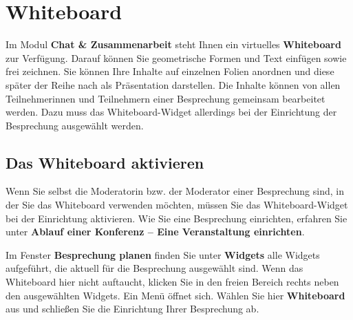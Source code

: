 \documentclass[
  letterpaper,
  DIV=11,
  numbers=noendperiod]{scrreprt}
\begin{document}
\section{Whiteboard}\label{whiteboard}

Im Modul \textbf{Chat \& Zusammenarbeit} steht Ihnen ein virtuelles
\textbf{Whiteboard} zur Verfügung. Darauf können Sie geometrische Formen
und Text einfügen sowie frei zeichnen. Sie können Ihre Inhalte auf
einzelnen Folien anordnen und diese später der Reihe nach als
Präsentation darstellen. Die Inhalte können von allen Teilnehmerinnen
und Teilnehmern einer Besprechung gemeinsam bearbeitet werden. Dazu muss
das Whiteboard-Widget allerdings bei der Einrichtung der Besprechung
ausgewählt werden.

\subsection{Das Whiteboard aktivieren}\label{das-whiteboard-aktivieren}

Wenn Sie selbst die Moderatorin bzw. der Moderator einer Besprechung
sind, in der Sie das Whiteboard verwenden möchten, müssen Sie das
Whiteboard-Widget bei der Einrichtung aktivieren. Wie Sie eine
Besprechung einrichten, erfahren Sie unter \textbf{Ablauf einer
Konferenz -- Eine Veranstaltung einrichten}.

Im Fenster \textbf{Besprechung planen} finden Sie unter \textbf{Widgets}
alle Widgets aufgeführt, die aktuell für die Besprechung ausgewählt
sind. Wenn das Whiteboard hier nicht auftaucht, klicken Sie in den
freien Bereich rechts neben den ausgewählten Widgets. Ein Menü öffnet
sich. Wählen Sie hier \textbf{Whiteboard} aus und schließen Sie die
Einrichtung Ihrer Besprechung ab.
\end{document}
